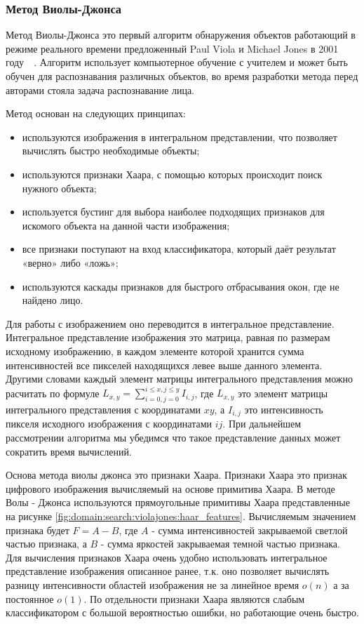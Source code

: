 \subsubsection{Метод Виолы-Джонса}
\label{sub:domain:search:violajones}

Метод Виолы-Джонса  это первый алгоритм обнаружения объектов работающий в режиме реального времени предложенный Paul Viola и Michael Jones в 2001 году~\cite{viola_jones_wiki}~\cite{viola_jones_habr}. Алгоритм использует компьютерное обучение с учителем и может быть обучен для распознавания различных объектов, во время разработки метода перед авторами стояла задача распознавание лица. 

Метод основан на следующих принципах:
\begin{itemize}
  \item используются изображения в интегральном представлении, что позволяет вычислять быстро необходимые объекты;
  \item используются признаки Хаара, с помощью которых происходит поиск нужного объекта;
  \item используется бустинг для выбора наиболее подходящих признаков для искомого объекта на данной части изображения;
  \item все признаки поступают на вход классификатора, который даёт результат «верно» либо «ложь»;
  \item используются каскады признаков для быстрого отбрасывания окон, где не найдено лицо.
\end{itemize}

Для работы с изображением оно переводится в интегральное представление. Интегральное представление изображения это матрица, равная по размерам исходному изображению, в каждом элементе которой хранится сумма интенсивностей все пикселей находящихся левее выше данного элемента. Другими словами каждый элемент матрицы интегрального представления можно расчитать по формуле 
$ L_{x,y} = \sum_{i=0,j=0}^{i \leq x, j \leq y} I_{i,j} $, где $L_{x,y}$ это элемент матрицы интегрального представления с координатами $xy$, а $I_{i,j}$ это интенсивность пикселя исходного изображения с координатами $ij$.
При дальнейшем рассмотрении алгоритма мы убедимся что такое представление данных может сократить время вычислений.

Основа метода виолы джонса это признаки Хаара. Признаки Хаара это признак цифрового изображения вычисляемый на основе примитива Хаара. В методе Волы - Джонса используются прямоугольные примитивы Хаара представленные на рисунке \ref{fig:domain:search:violajones:haar_features}. Вычисляемым значением признака будет $F = A - B$, где $A$ - сумма интенсивностей закрываемой светлой частью признака, а $B$ - сумма яркостей закрываемая темной частью признака. Для вычисления признаков Хаара очень удобно использовать интегральное представление изображения описанное ранее, т.к. оно позволяет вычислять разницу интенсивности областей изображения не за линейное время $o(n)$ а за постоянное $o(1)$. По отдельности признаки Хаара являются слабым классификатором с большой вероятностью ошибки, но работающие очень быстро. 

